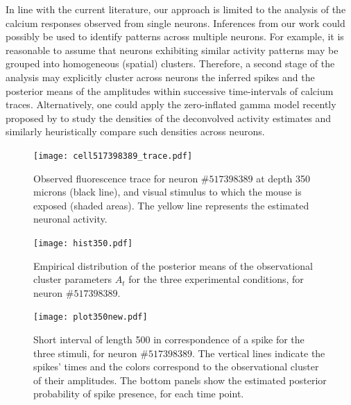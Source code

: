 In line with the current literature, our approach is limited to the analysis of the calcium responses observed from single neurons.
Inferences from our work could possibly be used to identify patterns across multiple neurons. For example, it is reasonable to assume that neurons exhibiting similar activity patterns may be grouped into homogeneous (spatial) clusters. Therefore, a second stage of the analysis may explicitly cluster across neurons the inferred spikes and the posterior means of the amplitudes within successive time-intervals of calcium traces. Alternatively, one could apply the zero-inflated gamma model recently proposed by \textcite{wei2019} to study the densities of the deconvolved activity estimates and similarly heuristically compare such densities across neurons. 

\newpage

\begin{figure}
	\centerline{\texttt{[image: cell517398389\_trace.pdf]}}
	\caption[Observed fluorescence trace of neuron $\#517398389$ from the Allen Brain Observatory data and estimated neuronal activity.]{Observed fluorescence trace for neuron $\#517398389$ at depth 350 microns (black line), and visual stimulus to which the mouse is exposed (shaded areas). The yellow line represents the estimated neuronal activity.}
	\label{fig:cell1_trace}
\end{figure}
\begin{figure}
	\centering
	\begin{minipage}{0.45\textwidth}
		\centering
		\texttt{[image: hist350.pdf]}
		\caption[Distribution of the observational cluster parameters for the three experimental conditions of neuron $\#517398389$.]{Empirical distribution of the posterior means of the observational cluster parameters $A_t$ for the three experimental conditions, for neuron $\#517398389$.}
		\label{fig:A_distr1}
	\end{minipage}\hfill
	\begin{minipage}{0.45\textwidth}
		\centering
		\texttt{[image: plot350new.pdf]}
		\caption[Visual representation of the estimated spikes and their amplitudes in the calcium trace of neuron $\#517398389$.]{Short interval of length 500 in correspondence of a spike for the three stimuli, for neuron $\#517398389$. The vertical lines indicate the spikes' times and the colors correspond to the observational cluster of their amplitudes. The bottom panels show the estimated posterior probability of spike presence, for each time point.}
		\label{fig:spike_color1}
	\end{minipage}
\end{figure}






